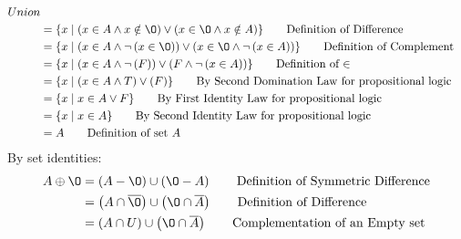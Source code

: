 \documentclass[12pt letter]{report}
\begin{document}
{\begin{enumerate}
\begin{align*}
{			      Union}                                                                                                             \\
			                  & = \{x  \mid \left( x \in A \wedge  x \notin \O \right)\vee  \left( x \in \O \wedge x \notin A
			      \right)   \} \tag*{Definition of Difference}                                                                       \\
			                  & = \{x  \mid \left( x \in A \wedge  \neg \left( x \in \O \right)  \right) \vee  \left( x
			      \in \O \wedge
			      \neg  \left( x \in A \right) \right)  \} \tag*{Definition of Complement}                                           \\
			                  & = \{x  \mid \left( x \in A \wedge  \neg \left( F \right)  \right) \vee \left( F \wedge \neg \left( x
			      \in A\right)   \right)   \} \tag*{Definition of $\in $}                                                            \\
			                  & = \{x  \mid \left( x \in A \wedge T \right) \vee \left( F \right)  \} \tag*{By Second Domination Law
			      for propositional logic}                                                                                           \\
			                  & = \{x \mid x \in A \vee F\} \tag*{By First Identity Law for propositional logic}                     \\
			                  & = \{x  \mid x \in A\} \tag*{By Second Identity Law for propositional logic}                          \\
			                  & = A \tag*{Definition of set $A$}                                                                     \\
		      \end{align*}
		      By set identities:
		      \begin{align*}
			      A \oplus \O & = \left( A - \O \right)  \cup \left( \O - A \right)  \tag*{Definition of Symmetric Difference}       \\
			                  & = \left( A \cap \overline{\O} \right) \cup \left( \O \cap \overline{A} \right) \tag*{Definition of
			      Difference}                                                                                                        \\
			                  & = \left( A \cap U \right) \cup \left( \O \cap \overline{A} \right) \tag*{Complementation of an Empty
			      set}                                                                                                               \\

\end{align*}
\end{enumerate}}
\end{document}
